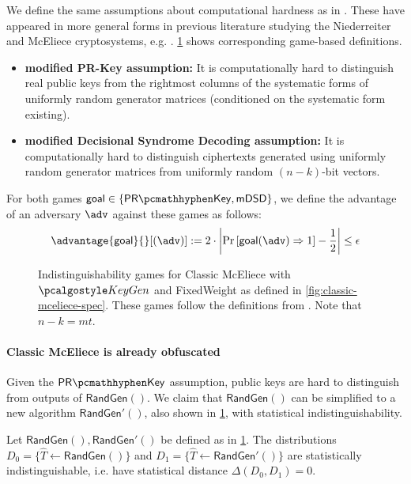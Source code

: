 We define the same assumptions about computational hardness as in \cite[Definition~K.1]{EC:Xagawa22}. These have appeared in more general forms in previous literature studying the Niederreiter and McEliece cryptosystems, e.g. \cite{AC:CouFinSen01,EC:SaiXagYam18}. \cref{fig:classic-mceliece-assumptions} shows corresponding game-based definitions.
\begin{itemize}
    \item \textbf{modified PR-Key assumption:} It is computationally hard to distinguish real public keys from the rightmost columns of the systematic forms of uniformly random generator matrices (conditioned on the systematic form existing).
    \item \textbf{modified Decisional Syndrome Decoding assumption:} It is computationally hard to distinguish ciphertexts generated using uniformly random generator matrices from uniformly random $(n-k)$-bit vectors.
\end{itemize}

For both games $\mathsf{goal} \in \{\prkey, \mdsd\}$, we define the advantage of an adversary $\adv$ against these games as follows:
\[ \advantage{\mathsf{goal}}{}[(\adv)] := 2 \cdot \left| \Pr\left[\mathsf{goal}(\adv) \Rightarrow 1\right] - \frac{1}{2} \right| \leq \epsilon \]

\begin{figure}
    
    \caption{Indistinguishability games for Classic McEliece with $\kgen$ and \textsf{FixedWeight} as defined in \cref{fig:classic-mceliece-spec}. These games follow the definitions from \cite[Definition~K.1]{EC:Xagawa22}. Note that $n-k = mt$.}
    \label{fig:classic-mceliece-assumptions}
\end{figure}

\paragraph{Classic McEliece is already obfuscated}

Given the $\prkey$ assumption, public keys are hard to distinguish from outputs of $\textsf{RandGen}()$. We claim that $\textsf{RandGen}()$ can be simplified to a new algorithm $\textsf{RandGen}'()$, also shown in \cref{fig:classic-mceliece-assumptions}, with statistical indistinguishability.

\begin{lemma} \label{lem:classic-mceliece-randgen-prime}
    Let $\textsf{RandGen}(), \textsf{RandGen}'()$ be defined as in \cref{fig:classic-mceliece-assumptions}.
    The distributions $D_0 = \{ \hat T \gets \textsf{RandGen}() \}$ and $D_1 = \{ \hat T \gets \textsf{RandGen}'() \}$ are statistically indistinguishable, i.e. have statistical distance $\Delta(D_0, D_1) = 0$.
\end{lemma}

